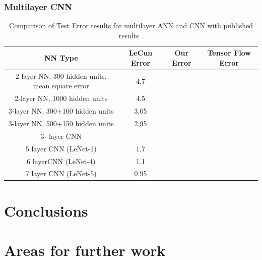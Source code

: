 \documentclass[12pt, twocolumn]{article}
\begin{document}
\subsubsection{Multilayer CNN}



\begin{center}
\begin{table}[t]
\begin{tabular} { |c | c | c | c | }
    \hline
    NN Type & LeCun Error  &  Our Error  & Tensor Flow Error \\ \hline
    2-layer NN, 300 hidden units, mean square error & 4.7 &  & \\ \hline
    2-layer NN, 1000 hidden units & 4.5 & & \\ \hline
    3-layer NN, 300+100 hidden units & 3.05 & &  \\ \hline
    3-layer NN, 500+150 hidden units & 2.95 & & \\ \hline
    3- layer CNN &  -- &  & \\ \hline
    5 layer CNN  (LeNet-1) & 1.7 &  & \\ \hline 
    6 layerCNN (LeNet-4) & 1.1& & \\ \hline 
    7 layer CNN (LeNet-5) &  0.95 & &\\ \hline
\end{tabular}
\label{table: MNISTLeCun}
\caption{Comparison of Test Error results for multilayer ANN and CNN with published results \cite{LeCun1998}.}
\end{table}
\end{center}



\section{Conclusions}

\section{Areas for further work}



 
\end{document}
